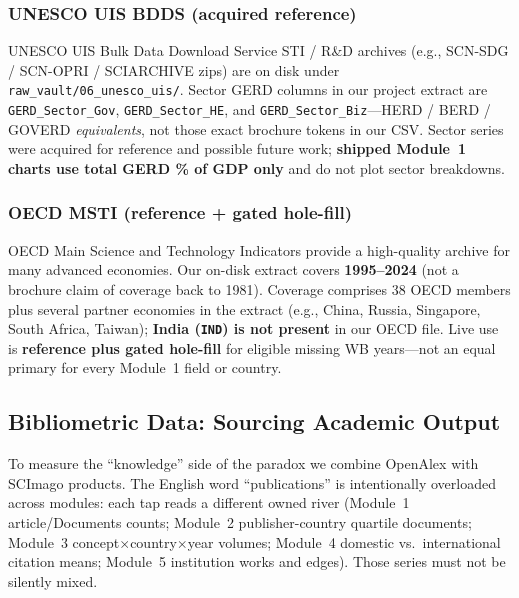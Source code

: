 \subsubsection{UNESCO UIS BDDS (acquired reference)}
UNESCO UIS Bulk Data Download Service STI / R\&D archives (e.g., SCN-SDG / SCN-OPRI / SCIARCHIVE zips) are on disk under \texttt{raw\_vault/06\_unesco\_uis/}. Sector GERD columns in our project extract are \texttt{GERD\_Sector\_Gov}, \texttt{GERD\_Sector\_HE}, and \texttt{GERD\_Sector\_Biz}---HERD / BERD / GOVERD \emph{equivalents}, not those exact brochure tokens in our CSV. Sector series were acquired for reference and possible future work; \textbf{shipped Module~1 charts use total GERD \% of GDP only} and do not plot sector breakdowns.

\subsubsection{OECD MSTI (reference + gated hole-fill)}
OECD Main Science and Technology Indicators provide a high-quality archive for many advanced economies. Our on-disk extract covers \textbf{1995--2024} (not a brochure claim of coverage back to 1981). Coverage comprises 38 OECD members plus several partner economies in the extract (e.g., China, Russia, Singapore, South Africa, Taiwan); \textbf{India (\texttt{IND}) is not present} in our OECD file. Live use is \textbf{reference plus gated hole-fill} for eligible missing WB years---not an equal primary for every Module~1 field or country.

\subsection{Bibliometric Data: Sourcing Academic Output}
To measure the ``knowledge'' side of the paradox we combine OpenAlex with SCImago products. The English word ``publications'' is intentionally overloaded across modules: each tap reads a different owned river (Module~1 article/Documents counts; Module~2 publisher-country quartile documents; Module~3 concept$\times$country$\times$year volumes; Module~4 domestic vs.\ international citation means; Module~5 institution works and edges). Those series must not be silently mixed.

